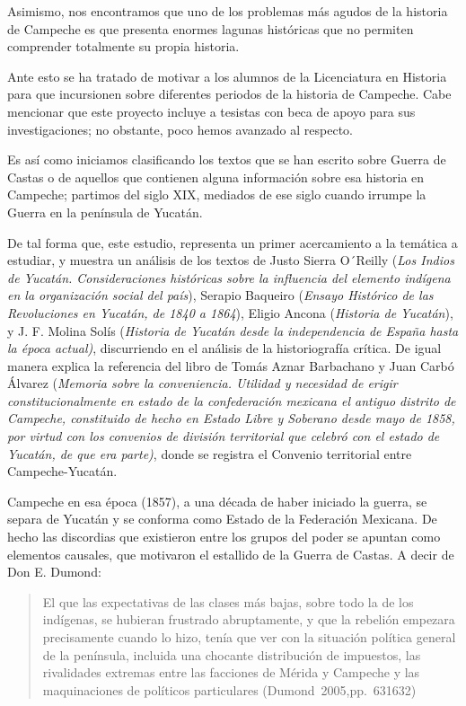 Asimismo, nos encontramos que uno de los problemas más agudos de la historia
de Campeche es que presenta enormes lagunas históricas que no permiten
comprender totalmente su propia historia. 


Ante esto se ha tratado de motivar a los alumnos de la Licenciatura en
Historia para que incursionen sobre diferentes periodos de la historia de
Campeche. Cabe mencionar que este proyecto incluye a tesistas con beca de
apoyo para sus investigaciones; no obstante, poco hemos avanzado al
respecto. 
 
Es así como iniciamos clasificando los textos que se han escrito  sobre
Guerra de Castas o  de aquellos que contienen alguna información sobre esa 
historia en Campeche; partimos  del siglo XIX, mediados de ese siglo cuando
irrumpe la Guerra en la península de Yucatán.


De tal forma que, este estudio, representa  un primer acercamiento a la
temática a estudiar, y muestra un análisis  de los textos  de  Justo
 Sierra O´Reilly (\textit{Los Indios de
Yucatán. Consideraciones históricas sobre la influencia del elemento
indígena en la organización social del
país}), Serapio
Baqueiro (\textit{Ensayo Histórico de las Revoluciones en Yucatán, de 1840
a 1864}), Eligio Ancona (\textit{Historia de Yucatán}), y J. F. Molina
Solís (\textit{Historia de Yucatán desde la independencia de España hasta
la época actual)}, discurriendo en el análisis de  la historiografía
crítica. De igual manera explica la referencia del libro de Tomás
Aznar Barbachano y Juan Carbó Álvarez
(\textit{Memoria sobre la conveniencia. Utilidad y
necesidad de erigir constitucionalmente en estado de la confederación
mexicana el antiguo distrito de Campeche, constituido de hecho en Estado
Libre y Soberano desde mayo de 1858, por virtud con los convenios de
división territorial que celebró con el estado de Yucatán, de que era
parte)}, donde se registra el Convenio territorial entre
Campeche-Yucatán.

Campeche en esa época (1857),  a una década de haber iniciado la guerra, se
 separa de Yucatán y se conforma como Estado de la Federación Mexicana. De
hecho las discordias que existieron entre los grupos del poder se apuntan
como elementos causales, que motivaron el estallido de la Guerra de Castas.
A decir de Don E. Dumond:

\begin{quotation}
El que las expectativas de las clases más bajas, sobre todo la de los
indígenas, se hubieran frustrado abruptamente, y que la rebelión empezara
precisamente cuando lo hizo, tenía que ver con la situación política
general  de la península, incluida una chocante distribución de impuestos,
las rivalidades extremas entre las facciones de Mérida y Campeche y las
maquinaciones de políticos particulares (Dumond~2005,\linebreak pp.~631\textendash{}632)
\end{quotation} 

